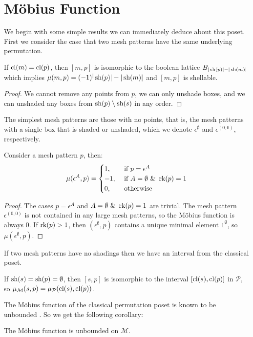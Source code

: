 \documentclass[11pt,a4paper,oneside]{article}
\begin{document}
\section{M\"obius Function}
We begin with some simple results we can immediately deduce about this poset. First we consider the case that two mesh patterns have the same underlying permutation.
\begin{lem}
If $\operatorname{\textrm{cl}}(m)=\operatorname{\textrm{cl}}(p)$, then $[m,p]$ is isomorphic to the boolean lattice $B_{|\operatorname{\textrm{sh}}(p)|-|\operatorname{\textrm{sh}}(m)|}$ which implies $\mu(m,p)=(-1)^|\operatorname{\textrm{sh}}(p)|-|\operatorname{\textrm{sh}}(m)|$ and $[m,p]$ is shellable.
\begin{proof}
We cannot remove any points from $p$, we can only unshade boxes, and we can unshaded any boxes from $\operatorname{\textrm{sh}}(p)\setminus\operatorname{\textrm{sh}}(s)$ in any order.
\end{proof}
\end{lem}

The simplest mesh patterns are those with no points, that is, the mesh patterns with a single box that is shaded or unshaded, which we denote $\epsilon^\emptyset$ and $\epsilon^{(0,0)}$, respectively.
\begin{lem}
Consider a mesh pattern $p$, then:
$$\mu(\epsilon^{A},p)=\begin{cases}
1,&\mbox{ if }p=\epsilon^A \\
-1,&\mbox{ if }A=\emptyset\,\,\&\,\,\operatorname{\textrm{rk}}(p)=1\\
0,&\mbox{ otherwise}
\end{cases}$$
\begin{proof}
The cases $p=\epsilon^A$ and $A=\emptyset\,\,\&\,\,\operatorname{\textrm{rk}}(p)=1$ are trivial. The mesh pattern $\epsilon^{(0,0)}$ is not contained in any large mesh patterns, so the M\"obius function is always $0$. If $\operatorname{\textrm{rk}}(p)>1$, then $(\epsilon^\emptyset,p)$ contains a unique minimal element $1^\emptyset$, so $\mu(\epsilon^\emptyset,p)$.
\end{proof}
\end{lem}

If two mesh patterns have no shadings then we have an interval from the classical poset.
\begin{lem}
If $\operatorname{\textrm{sh}}(s)=\operatorname{\textrm{sh}}(p)=\emptyset$, then $[s,p]$ is isomorphic to the interval $[\operatorname{\textrm{cl}}(s),\operatorname{\textrm{cl}}(p)]$ in $\mathcal{P}$, so $\operatorname{\mu_\mathcal{M}}(s,p)=\operatorname{\mu_\mathcal{P}}(\operatorname{\textrm{cl}}(s),\operatorname{\textrm{cl}}(p))$.
\end{lem}
The M\"obius function of the classical permutation poset is known to be unbounded \cite{Smith13}. So we get the following corollary:
\begin{cor}
The M\"obius function is unbounded on $\mathcal{M}$.
\end{cor}
\end{document}
